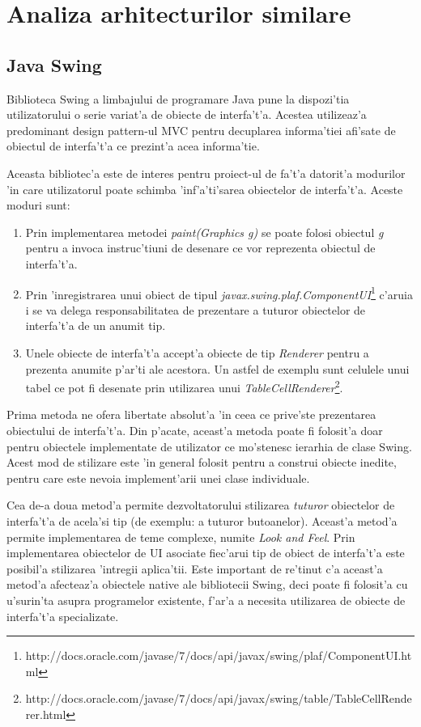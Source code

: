 \section{Analiza arhitecturilor similare}

\subsection{Java Swing}

Biblioteca Swing a limbajului de programare Java pune la dispozi'tia utilizatorului o serie variat'a de obiecte de interfa't'a. Acestea utilizeaz'a predominant design pattern-ul MVC pentru decuplarea informa'tiei afi'sate de obiectul de interfa't'a ce prezint'a acea informa'tie.

\medskip

Aceasta bibliotec'a este de interes pentru proiect-ul de fa't'a datorit'a modurilor 'in care utilizatorul poate schimba 'inf'a'ti'sarea obiectelor de interfa't'a. Aceste moduri sunt:

\begin{enumerate}
\item Prin implementarea metodei \emph{paint(Graphics g)} se poate folosi obiectul \emph{g} pentru a invoca instruc'tiuni de desenare ce vor reprezenta obiectul de interfa't'a.
\item Prin 'inregistrarea unui obiect de tipul \emph{javax.swing.plaf.ComponentUI}\footnote{http://docs.oracle.com/javase/7/docs/api/javax/swing/plaf/ComponentUI.html} c'aruia i se va delega responsabilitatea de prezentare a tuturor obiectelor de interfa't'a de un anumit tip.
\item Unele obiecte de interfa't'a accept'a obiecte de tip \emph{Renderer} pentru a prezenta anumite p'ar'ti ale acestora. Un astfel de exemplu sunt celulele unui tabel ce pot fi desenate prin utilizarea unui \emph{TableCellRenderer}\footnote{http://docs.oracle.com/javase/7/docs/api/javax/swing/table/TableCellRenderer.html}.
\end{enumerate}

Prima metoda ne ofera libertate absolut'a 'in ceea ce prive'ste prezentarea obiectului de interfa't'a. Din p'acate, aceast'a metoda poate fi folosit'a doar pentru obiectele implementate de utilizator ce mo'stenesc ierarhia de clase Swing. Acest mod de stilizare este 'in general folosit pentru a construi obiecte inedite, pentru care este nevoia implement'arii unei clase individuale.

\medskip

Cea de-a doua metod'a permite dezvoltatorului stilizarea \emph{tuturor} obiectelor de interfa't'a de acela'si tip (de exemplu: a tuturor butoanelor). Aceast'a metod'a permite implementarea de teme complexe, numite \emph{Look and Feel}. Prin implementarea obiectelor de UI asociate fiec'arui tip de obiect de interfa't'a este posibil'a stilizarea 'intregii aplica'tii. Este important de re'tinut c'a aceast'a metod'a afecteaz'a obiectele native ale bibliotecii Swing, deci poate fi folosit'a cu u'surin'ta asupra programelor existente, f'ar'a a necesita utilizarea de obiecte de interfa't'a specializate.

